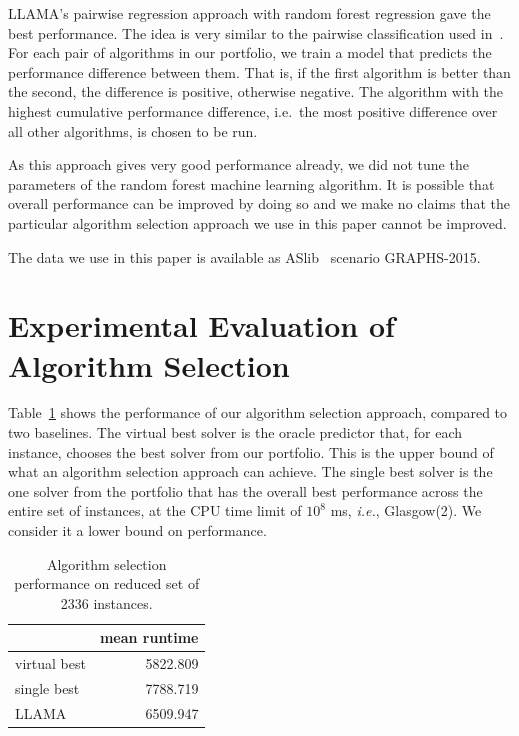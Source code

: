 \documentclass{llncs}
\begin{document}
LLAMA's pairwise regression approach with random forest regression gave the best
performance. The idea is very similar to the pairwise classification used
in~\cite{xu_satzilla_2008}. For each pair of algorithms in our portfolio, we
train a model that predicts the performance difference between them. That is, if
the first algorithm is better than the second, the difference is positive,
otherwise negative. The algorithm with the highest cumulative performance
difference, i.e.\ the most positive difference over all other algorithms, is
chosen to be run.

As this approach gives very good performance already, we did not tune the
parameters of the random forest machine learning algorithm. It is possible that
overall performance can be improved by doing so and we make no claims that the
particular algorithm selection approach we use in this paper cannot be improved.

The data we use in this paper is available as ASlib~\cite{aslib} scenario
GRAPHS-2015.


\section{Experimental Evaluation of Algorithm Selection}

Table~\ref{tab:res} shows the performance of our algorithm selection approach, compared to two
baselines. The virtual best solver is the oracle predictor that, for each instance, chooses the best
solver from our portfolio. This is the upper bound of what an algorithm selection approach can
achieve. The single best solver is the one solver from the portfolio that has the overall best
performance across the entire set of instances, at the CPU time limit of $10^8$ ms, {\em i.e.}, Glasgow(2). We consider it a lower bound on performance.

\begin{table}[ht]
\centering
\begin{tabular}{lr}
  \toprule
& mean runtime\\
  \midrule
virtual best & 5822.809\\
  single best & 7788.719\\
  LLAMA & 6509.947\\
   \bottomrule
\end{tabular}
\vspace{1ex}
\caption{Algorithm selection performance on reduced set of 2336
instances.}\label{tab:res}
\end{table}
\end{document}
